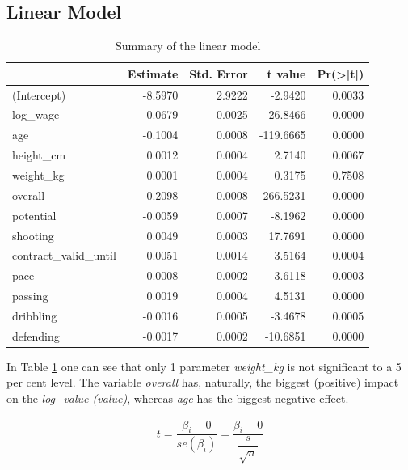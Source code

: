 \documentclass[12pt,a4paper]{article}
\begin{document}
\hypertarget{linear-model-1}{%
\subsection{Linear Model}\label{linear-model-1}}

\FloatBarrier
\begin{table}[!h]

\caption{\label{tab:structure and lm}\label{tab:sum_lm} Summary of the linear model}
\centering
\begin{tabular}[t]{lrrrr}
\toprule
  & Estimate & Std. Error & t value & Pr(>|t|)\\
\midrule
\rowcolor{gray!6}  (Intercept) & -8.5970 & 2.9222 & -2.9420 & 0.0033\\
log\_wage & 0.0679 & 0.0025 & 26.8466 & 0.0000\\
\rowcolor{gray!6}  age & -0.1004 & 0.0008 & -119.6665 & 0.0000\\
height\_cm & 0.0012 & 0.0004 & 2.7140 & 0.0067\\
\rowcolor{gray!6}  weight\_kg & 0.0001 & 0.0004 & 0.3175 & 0.7508\\
overall & 0.2098 & 0.0008 & 266.5231 & 0.0000\\
\rowcolor{gray!6}  potential & -0.0059 & 0.0007 & -8.1962 & 0.0000\\
shooting & 0.0049 & 0.0003 & 17.7691 & 0.0000\\
\rowcolor{gray!6}  contract\_valid\_until & 0.0051 & 0.0014 & 3.5164 & 0.0004\\
pace & 0.0008 & 0.0002 & 3.6118 & 0.0003\\
\rowcolor{gray!6}  passing & 0.0019 & 0.0004 & 4.5131 & 0.0000\\
dribbling & -0.0016 & 0.0005 & -3.4678 & 0.0005\\
\rowcolor{gray!6}  defending & -0.0017 & 0.0002 & -10.6851 & 0.0000\\
\bottomrule
\end{tabular}
\end{table}
\FloatBarrier

In Table \ref{tab:sum_lm} one can see that only 1 parameter
\emph{weight\_kg} is not significant to a 5 per cent level. The variable
\emph{overall} has, naturally, the biggest (positive) impact on the
\emph{log\_value (value)}, whereas \emph{age} has the biggest negative
effect.

\begin{align} 
\label{eq:t_test}
  t = \dfrac{\beta_i - 0}{se \left( \beta_i \right)} = \dfrac{\beta_i - 0}{ \dfrac{s}{\sqrt{n}} }  
\end{align}
\end{document}
